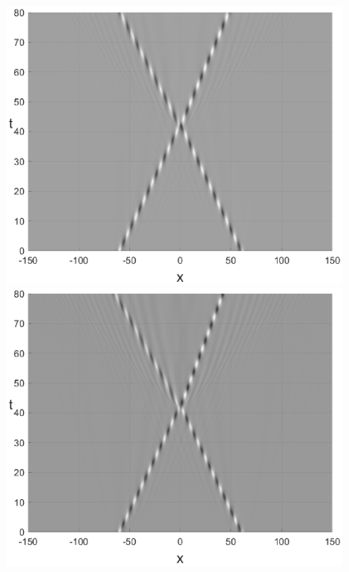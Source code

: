 \documentclass[14pt,a4paper]{extreport}
\begin{document}
\begin{figure}[H]
				\begin{minipage}[h]{0.32\linewidth}
					\includegraphics[width=1\linewidth]{fig54.eps}
				\end{minipage}
				\begin{minipage}[h]{0.32\linewidth}
					\includegraphics[width=1\linewidth]{fig57.eps}

\end{minipage}
\end{figure}
\end{document}
